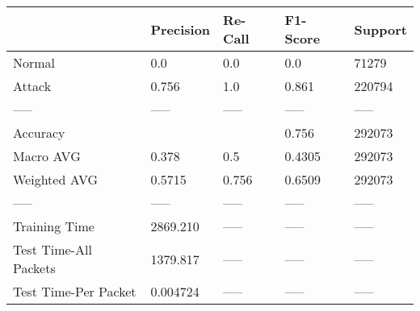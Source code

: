 \begin{tabular}{lllll}
\toprule
{} & Precision & Re-Call & F1-Score & Support \\
\midrule
Normal                &       0.0 &     0.0 &      0.0 &   71279 \\
Attack                &     0.756 &     1.0 &    0.861 &  220794 \\
-----                 &     ----- &   ----- &    ----- &   ----- \\
Accuracy              &           &         &    0.756 &  292073 \\
Macro AVG             &     0.378 &     0.5 &   0.4305 &  292073 \\
Weighted AVG          &    0.5715 &   0.756 &   0.6509 &  292073 \\
-----                 &     ----- &   ----- &    ----- &   ----- \\
Training Time         &  2869.210 &   ----- &    ----- &   ----- \\
Test Time-All Packets &  1379.817 &   ----- &    ----- &   ----- \\
Test Time-Per Packet  &  0.004724 &   ----- &    ----- &   ----- \\
\bottomrule
\end{tabular}

